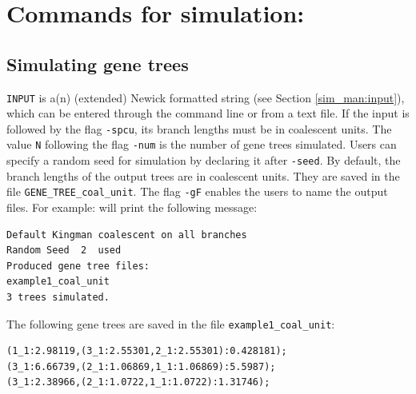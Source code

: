 \section{Commands for simulation:}
\subsection{Simulating gene trees}

{\tt INPUT} is a(n) (extended) Newick formatted string (see Section \ref{sim_man:input}), which can be entered through the command line or from a text file.
If the input is followed by the flag {\tt -spcu}, its branch lengths must be in coalescent units.
The value {\tt N} following the flag {\tt -num} is the number of gene trees simulated.
Users can specify a random seed for simulation by declaring it after {\tt -seed}.
By default, the branch lengths of the output trees are in coalescent units. They are saved in the file {\tt GENE\_TREE\_coal\_unit}. The flag {\tt -gF} enables the users to name the output files. For example:
will print the following message:
\begin{verbatim}
Default Kingman coalescent on all branches
Random Seed  2  used
Produced gene tree files:
example1_coal_unit
3 trees simulated.
\end{verbatim}
The following gene trees are saved in the file {\tt example1\_coal\_unit}:
\begin{verbatim}
(1_1:2.98119,(3_1:2.55301,2_1:2.55301):0.428181);
(3_1:6.66739,(2_1:1.06869,1_1:1.06869):5.5987);
(3_1:2.38966,(2_1:1.0722,1_1:1.0722):1.31746);
\end{verbatim}

